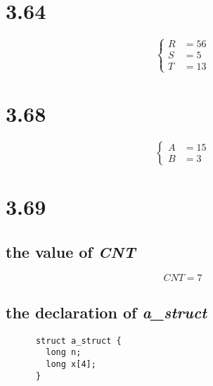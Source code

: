 \documentclass[10pt a4paper]{article}
\begin{document}
  \section{\textbf{3.64}}
    \begin{equation*}
      \begin{cases}
        R &= 56 \\
        S &= 5 \\
        T &= 13
      \end{cases}
    \end{equation*}

  \section{\textbf{3.68}}
    \begin{equation*}
      \begin{cases}
        A &= 15 \\
        B &= 3
      \end{cases}
    \end{equation*}

  \section{\textbf{3.69}}
    \subsection{\textbf{the value of \textit{CNT}}}
    $$CNT = 7$$

    \subsection{\textbf{the declaration of \textit{a\_struct}}}
    \begin{lstlisting}
      struct a_struct {
        long n;
        long x[4];
      }
    \end{lstlisting}
\end{document}
